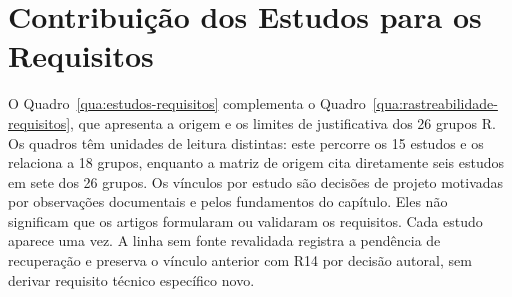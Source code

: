 \section{Contribuição dos Estudos para os Requisitos}

O Quadro~\ref{qua:estudos-requisitos} complementa o Quadro~\ref{qua:rastreabilidade-requisitos}, que apresenta a origem e os limites de justificativa dos 26 grupos R. Os quadros têm unidades de leitura distintas: este percorre os 15 estudos e os relaciona a 18 grupos, enquanto a matriz de origem cita diretamente seis estudos em sete dos 26 grupos. Os vínculos por estudo são decisões de projeto motivadas por observações documentais e pelos fundamentos do capítulo. Eles não significam que os artigos formularam ou validaram os requisitos. Cada estudo aparece uma vez. A linha sem fonte revalidada registra a pendência de recuperação e preserva o vínculo anterior com R14 por decisão autoral, sem derivar requisito técnico específico novo.

